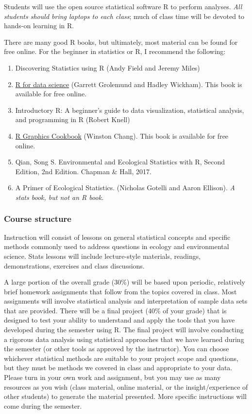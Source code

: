 \documentclass[
]{article}
\providecommand{\tightlist}{%
  \setlength{\itemsep}{0pt}\setlength{\parskip}{0pt}}
\begin{document}
Students will use the open source statistical software R to perform
analyses. \emph{All students should bring laptops to each class}; much
of class time will be devoted to hands-on learning in R.

There are many good R books, but ultimately, most material can be found
for free online. For the beginner in statistics or R, I recommend the
following:

\begin{enumerate}
\def\labelenumi{\arabic{enumi}.}
\tightlist
\item
  Discovering Statistics using R (Andy Field and Jeremy Miles)
\item
  \href{https://r4ds.had.co.nz/}{R for data science} (Garrett Grolemund
  and Hadley Wickham). This book is available for free online.
\item
  Introductory R: A beginner's guide to data visualization, statistical
  analysis, and programming in R (Robert Knell)
\item
  \href{https://r-graphics.org/}{R Graphics Cookbook} (Winston Chang).
  This book is available for free online.
\item
  Qian, Song S. Environmental and Ecological Statistics with R, Second
  Edition, 2nd Edition. Chapman \& Hall, 2017.
\item
  A Primer of Ecological Statistics. (Nicholas Gotelli and Aaron
  Ellison). \emph{A stats book, but not an R book.}
\end{enumerate}

\hypertarget{course-structure}{%
\subsubsection{Course structure}\label{course-structure}}

Instruction will consist of lessons on general statistical concepts and
specific methods commonly used to address questions in ecology and
environmental science. Stats lessons will include lecture-style
materials, readings, demonstrations, exercises and class discussions.

A large portion of the overall grade (30\%) will be based upon periodic,
relatively brief homework assignments that follow from the topics
covered in class. Most assignments will involve statistical analysis and
interpretation of sample data sets that are provided. There will be a
final project (40\% of your grade) that is designed to test your ability
to understand and apply the tools that you have developed during the
semester using R. The final project will involve conducting a rigorous
data analysis using statistical approaches that we have learned during
the semester (or other tools as approved by the instructor). You can
choose whichever statistical methods are suitable to your project scope
and questions, but they must be methods we covered in class and
appropriate to your data. Please turn in your own work and assignment,
but you may use as many resources as you wish (class material, online
material, or the insight/experience of other students) to generate the
material presented. More specific instructions will come during the
semester.
\end{document}
